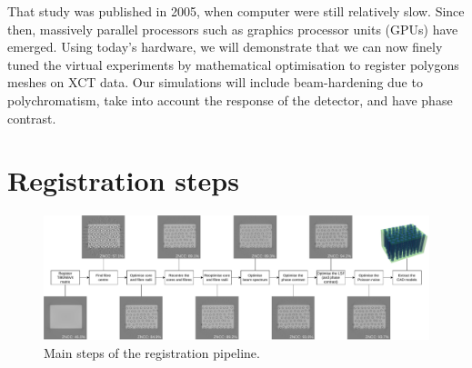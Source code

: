 \documentclass[11pt]{article}
\begin{document}
That study was published in 2005, when computer were still relatively
slow. Since then, massively parallel processors such as graphics
processor units (GPUs) have emerged. Using today's hardware, we will
demonstrate that we can now finely tuned the virtual experiments by
mathematical optimisation to register polygons meshes on XCT data. Our
simulations will include beam-hardening due to polychromatism, take into
account the response of the detector, and have phase contrast.

    \hypertarget{registration-steps}{%
\section{Registration steps}\label{registration-steps}}

\begin{figure}
\centering
\includegraphics{../doc/pipeline.pdf}
\caption{Main steps of the registration pipeline.}
\end{figure}
\end{document}
